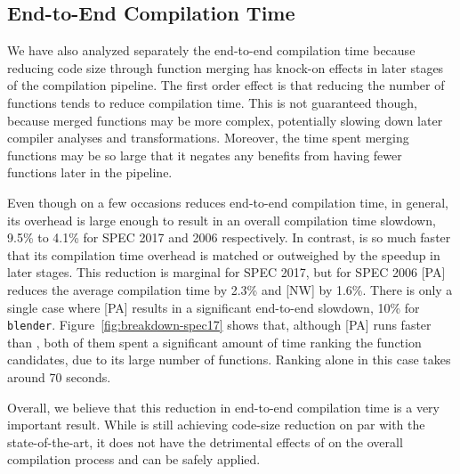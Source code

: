 \subsection{End-to-End Compilation Time} \label{sec:eval:compilation-time}

We have also analyzed separately the end-to-end compilation time because reducing code size through function merging has knock-on effects in later stages of the compilation pipeline.
The first order effect is that reducing the number of functions tends to reduce compilation time.
This is not guaranteed though, because merged functions may be more complex, potentially slowing down later compiler analyses and transformations.
Moreover, the time spent merging functions may be so large that it negates any benefits from having fewer functions later in the pipeline.

Even though on a few occasions {\SOAName} reduces end-to-end compilation time, in general, its overhead is large enough to result in an overall compilation time slowdown, 9.5\% to 4.1\% for SPEC 2017 and 2006 respectively.
In contrast, {\ProjName} is so much faster that its compilation time overhead is matched or outweighed by the speedup in later stages. 
This reduction is marginal for SPEC 2017, but for SPEC 2006 {[PA]} reduces the average compilation time by 2.3\% and {[NW]} by 1.6\%.
There is only a single case where {[PA]} results in a significant end-to-end slowdown, 10\% for \texttt{blender}.
Figure~\ref{fig:breakdown-spec17} shows that, although [PA] runs faster than {\SOAName}, both of them spent a significant amount of time ranking the function candidates, due to its large number of functions.
Ranking alone in this case takes around 70 seconds. %

Overall, we believe that this reduction in end-to-end compilation time is a very important result. While {\ProjName} is still achieving code-size reduction on par with the state-of-the-art, it does not have the detrimental effects of {\SOAName} on the overall compilation process and can be safely applied.

